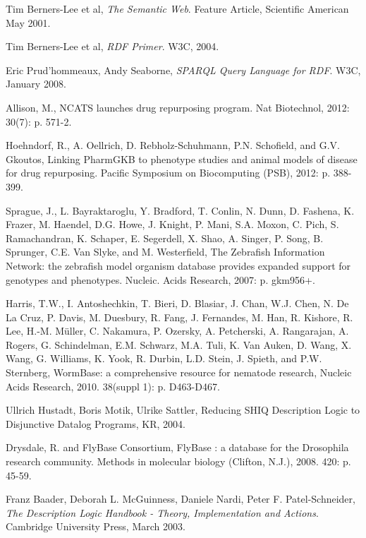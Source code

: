 \documentclass{article}
\begin{document}
\begin{thebibliography}{9}

  Tim Berners-Lee et al,
  \emph{The Semantic Web}.
  Feature Article, Scientific American
  May 2001.

 Tim Berners-Lee et al,
 \emph{RDF Primer}.
 W3C,
 2004.

  Eric Prud'hommeaux, Andy Seaborne,
  \emph{SPARQL Query Language for RDF}.
  W3C,
  January 2008.

  Allison, M., NCATS launches drug repurposing program.
  Nat Biotechnol,
  2012: 30(7): p. 571-2.
  
  Hoehndorf, R., A. Oellrich, D. Rebholz-Schuhmann, P.N. Schofield, and G.V. Gkoutos,
  Linking PharmGKB to phenotype studies and animal models of disease for drug repurposing. 
  Pacific Symposium on Biocomputing (PSB), 
  2012: p. 388-399.

  Sprague, J., L. Bayraktaroglu, Y. Bradford, T. Conlin, N. Dunn, D. Fashena, K. Frazer, M. Haendel, D.G. Howe, J. Knight, P. Mani, S.A. Moxon, C. Pich, S. Ramachandran, K. Schaper, E. Segerdell, X. Shao, A. Singer, P. Song, B. Sprunger, C.E. Van Slyke, and M. Westerfield, 
  The Zebrafish Information Network: the zebrafish model organism database provides expanded support for genotypes and phenotypes. 
  Nucleic. Acids Research,
  2007: p. gkm956+.

  Harris, T.W., I. Antoshechkin, T. Bieri, D. Blasiar, J. Chan, W.J. Chen, N. De La Cruz, P. Davis, M. Duesbury, R. Fang, J. Fernandes, M. Han, R. Kishore, R. Lee, H.-M. M\"uller, C. Nakamura, P. Ozersky, A. Petcherski, A. Rangarajan, A. Rogers, G. Schindelman, E.M. Schwarz, M.A. Tuli, K. Van Auken, D. Wang, X. Wang, G. Williams, K. Yook, R. Durbin, L.D. Stein, J. Spieth, and P.W. Sternberg, 
  WormBase: a comprehensive resource for nematode research,
  Nucleic Acids Research,
  2010. 38(suppl 1): p. D463-D467.

  Ullrich Hustadt, Boris Motik, Ulrike Sattler,
  Reducing SHIQ Description Logic to Disjunctive Datalog Programs,
  KR,
  2004.

  Drysdale, R. and FlyBase Consortium, FlyBase : a database for the Drosophila research community.
  Methods in molecular biology (Clifton, N.J.), 2008. 420: p. 45-59.

 Franz Baader, Deborah L. McGuinness, Daniele Nardi, Peter F. Patel-Schneider,
 \emph{The Description Logic Handbook - Theory, Implementation and Actions}.
 Cambridge University Press,
 March 2003.


\end{thebibliography}
\end{document}
